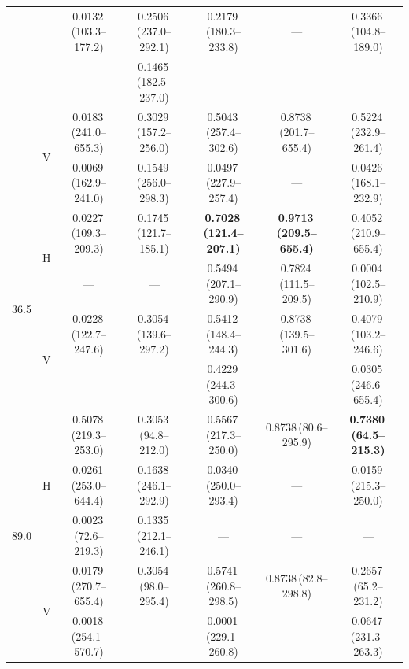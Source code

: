 \documentclass[preprint,review,12pt,authoryear]{elsarticle}
\begin{document}
\begin{table}[p]
{\begin{tabular}{@{}llccccc@{}}
    &   & 0.0132\,(103.3--177.2) & 0.2506\,(237.0--292.1) & 0.2179\,(180.3--233.8) & ---                   & 0.3366\,(104.8--189.0) \\
    &   & ---                   & 0.1465\,(182.5--237.0) & ---                   & ---                   & --- \\[6pt]
    & \multirow{2}{*}{V}
        & 0.0183\,(241.0--655.3) & 0.3029\,(157.2--256.0) & 0.5043\,(257.4--302.6) & 0.8738\,(201.7--655.4) & 0.5224\,(232.9--261.4) \\
    &   & 0.0069\,(162.9--241.0) & 0.1549\,(256.0--298.3) & 0.0497\,(227.9--257.4) & ---                   & 0.0426\,(168.1--232.9) \\
\midrule
\multirow{4}{*}{36.5}
    & \multirow{2}{*}{H}
        & 0.0227\,(109.3--209.3) & 0.1745\,(121.7--185.1) & \textbf{0.7028\,(121.4--207.1)} & \textbf{0.9713\,(209.5--655.4)} & 0.4052\,(210.9--655.4) \\
    &   & ---                   & ---                   & 0.5494\,(207.1--290.9) & 0.7824\,(111.5--209.5) & 0.0004\,(102.5--210.9) \\[6pt]
    & \multirow{2}{*}{V}
        & 0.0228\,(122.7--247.6) & 0.3054\,(139.6--297.2) & 0.5412\,(148.4--244.3) & 0.8738\,(139.5--301.6) & 0.4079\,(103.2--246.6) \\
    &   & ---                   & ---                   & 0.4229\,(244.3--300.6) & ---                   & 0.0305\,(246.6--655.4) \\
\midrule
\multirow{5}{*}{89.0}
    & \multirow{3}{*}{H}
        & 0.5078\,(219.3--253.0) & 0.3053\,(94.8--212.0)  & 0.5567\,(217.3--250.0) & 0.8738\,(80.6--295.9)  & \textbf{0.7380\,(64.5--215.3)}  \\
    &   & 0.0261\,(253.0--644.4) & 0.1638\,(246.1--292.9) & 0.0340\,(250.0--293.4) & ---                   & 0.0159\,(215.3--250.0) \\
    &   & 0.0023\,(72.6--219.3)  & 0.1335\,(212.1--246.1) & ---                   & ---                   & ---\\[6pt]
    & \multirow{2}{*}{V}
        & 0.0179\,(270.7--655.4) & 0.3054\,(98.0--295.4)  & 0.5741\,(260.8--298.5) & 0.8738\,(82.8--298.8)  & 0.2657\,(65.2--231.2)  \\
    &   & 0.0018\,(254.1--570.7) & ---                   & 0.0001\,(229.1--260.8) & ---                   & 0.0647\,(231.3--263.3) \\
\bottomrule
\end{tabular}}
\end{table}
\end{document}
